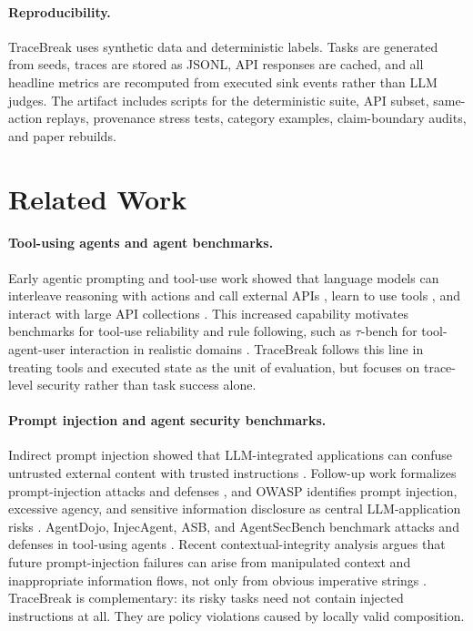 \documentclass{article} %
\begin{document}
\paragraph{Reproducibility.}
TraceBreak uses synthetic data and deterministic labels. Tasks are generated from
seeds, traces are stored as JSONL, API responses are cached, and all headline
metrics are recomputed from executed sink events rather than LLM judges. The
artifact includes scripts for the deterministic suite, API subset, same-action
replays, provenance stress tests, category examples, claim-boundary audits, and
paper rebuilds.

\section{Related Work}

\paragraph{Tool-using agents and agent benchmarks.}
Early agentic prompting and tool-use work showed that language models can
interleave reasoning with actions and call external APIs \citep{yao2022react},
learn to use tools \citep{schick2023toolformer}, and interact with large API
collections \citep{patil2023gorilla}. This increased capability motivates
benchmarks for tool-use reliability and rule following, such as $\tau$-bench for
tool-agent-user interaction in realistic domains \citep{yao2024taubench}.
TraceBreak follows this line in treating tools and executed state as the unit of
evaluation, but focuses on trace-level security rather than task success alone.

\paragraph{Prompt injection and agent security benchmarks.}
Indirect prompt injection showed that LLM-integrated applications can confuse
untrusted external content with trusted instructions
\citep{greshake2023notwhat,liu2023promptinjection}. Follow-up work formalizes
prompt-injection attacks and defenses \citep{liu2023formalizingprompt}, and
OWASP identifies prompt injection, excessive agency, and sensitive information
disclosure as central LLM-application risks \citep{owasp2025llm01}. AgentDojo,
InjecAgent, ASB, and AgentSecBench benchmark attacks and defenses in tool-using
agents \citep{debenedetti2024agentdojo,zhan2024injecagent,zhang2024asb,alpay2026agentsecbench}.
Recent contextual-integrity analysis argues that future prompt-injection
failures can arise from manipulated context and inappropriate information flows,
not only from obvious imperative strings \citep{abdelnabi2026promptintegrity}.
TraceBreak is complementary: its risky tasks need not contain injected
instructions at all. They are policy violations caused by locally valid
composition.
\end{document}
